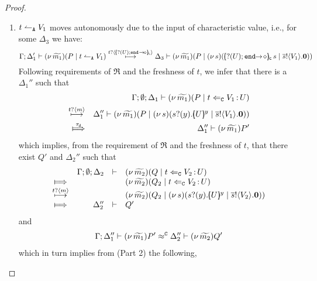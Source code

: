 \begin{proof}
\begin{enumerate}[1.]
\begin{enumerate}
					\item	%
						$t \leftharpoonup_\mathtt{A} V_1$ moves autonomously due to the input of characteristic value, i.e., for some $\Delta_3$ we have:
						\[
							\horel{\Gamma}{\Delta_1'}{\newsp{\widetilde{m_1}}{P \Par \ntrigger{t}{V_1}}}
							{\hby{\bactinp{t}{\omapchar{\shot{\btinp{U} \tinact~}}}}}
							{\Delta_3}{\newsp{\widetilde{m_1}}{P \Par \newsp{s}{ \appl{\omapchar{\shot{\btinp{U} \tinact}}}{s} \Par \bout{\dual{s}}{V_1} \inact}}}
						\]
							Following requirements of $\Re$ and the freshness of $t$,
							we infer that there is a $\Delta_1''$ such that
						\begin{eqnarray*}
							&& \Gamma; \es; \Delta_1 \proves \newsp{\widetilde{m_1}}{P \Par \ftrigger{t}{V_1}{U}}\\
							\hby{\bactinp{t}{m}} &&
							\Delta_1'' \proves \newsp{\widetilde{m_1}}{P \Par \newsp{s}{\binp{s}{y} \mapchar{U}{y} \Par \bout{\dual{s}}{V_1} \inact}}\\
							\Hby{\dtau} &&
							\Delta_1'' \proves \news{\widetilde{m_1}}P'
						\end{eqnarray*}
							which implies, from the  requirement of $\Re$ and
							the freshness of $t$, that there exist $Q'$ and $\Delta_2''$ such that
							\begin{eqnarray}
								\begin{array}{crll}
									& \Gamma; \es; \Delta_2 & \proves &		
									\newsp{\widetilde{m_2}}{Q \Par \ftrigger{t}{V_2}{U}}
									\\
									\Hby{} &&&
									\newsp{\widetilde{m_2}}{Q_2 \Par \ftrigger{t}{V_2}{U}}
									\\
									{\hby{\bactinp{t}{m}}}& & &
									\newsp{\widetilde{m_2}}{Q_2 \Par \newsp{s}{\binp{s}{y} \mapchar{U}{y} \Par \bout{\dual{s}}{V_2} \inact}}
									\\
									\Hby{} & \Delta_2'' & \proves & Q'
								\end{array}
								\label{proof:trig_equiv2}
							\end{eqnarray}
							and
							\begin{eqnarray*}
								\Gamma; \Delta_1'' \vdash (\nu\, \widetilde{m_1})P' \approx^\mathtt{C} \Delta_2'' \vdash (\nu\, \widetilde{m_2})Q'
							\end{eqnarray*}
							which in turn implies from  (Part 2)  the following, 

\end{enumerate}
\end{enumerate}
\end{proof}
